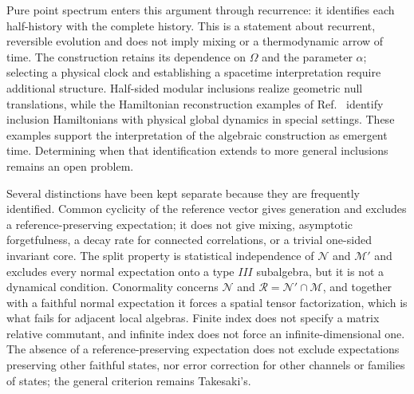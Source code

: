 \documentclass[a4paper,11pt]{article}
\theoremstyle{definition}
\newcommand{\mR}{\mathcal{R}}
\newcommand{\mN}{\mathcal{N}}
\newcommand{\mM}{\mathcal{M}}
\begin{document}
Pure point spectrum enters this argument through recurrence: it identifies each half-history with the complete history. This is a statement about recurrent, reversible evolution and does not imply mixing or a thermodynamic arrow of time. The construction retains its dependence on $\Omega$ and the parameter $\alpha$; selecting a physical clock and establishing a spacetime interpretation require additional structure. Half-sided modular inclusions realize geometric null translations, while the Hamiltonian reconstruction examples of Ref.~\cite{chen2026local} identify inclusion Hamiltonians with physical global dynamics in special settings. These examples support the interpretation of the algebraic construction as emergent time. Determining when that identification extends to more general inclusions remains an open problem.

Several distinctions have been kept separate because they are frequently identified. Common cyclicity of the reference vector gives generation and excludes a reference-preserving expectation; it does not give mixing, asymptotic forgetfulness, a decay rate for connected correlations, or a trivial one-sided invariant core. The split property is statistical independence of $\mN$ and $\mM'$ and excludes every normal expectation onto a type $III$ subalgebra, but it is not a dynamical condition. Conormality concerns $\mN$ and $\mR=\mN'\cap\mM$, and together with a faithful normal expectation it forces a spatial tensor factorization, which is what fails for adjacent local algebras. Finite index does not specify a matrix relative commutant, and infinite index does not force an infinite-dimensional one. The absence of a reference-preserving expectation does not exclude expectations preserving other faithful states, nor error correction for other channels or families of states; the general criterion remains Takesaki's.
\end{document}
